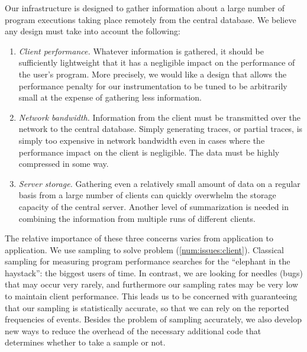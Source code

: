Our infrastructure is designed to gather information about a
large number of program executions taking place remotely from
the central database.  We believe any design must take into account
the following:
\begin{enumerate}
  
\item \label{num:issues:client} \emph{Client performance.}  Whatever
  information is gathered, it should be sufficiently lightweight that
  it has a negligible impact on the performance of the user's program.
  More precisely, we would like a design that allows the performance
  penalty for our instrumentation to be tuned to be arbitrarily small
  at the expense of gathering less information.
  
\item \label{num:issues:network} \emph{Network bandwidth.}
  Information from the client must be transmitted over the network to
  the central database.  Simply generating traces, or partial traces,
  is simply too expensive in network bandwidth even in cases where the
  performance impact on the client is negligible.  The data must be
  highly compressed in some way.
  
\item \label{num:issues:server} \emph{Server storage.}  Gathering even
  a relatively small amount of data on a regular basis from a large
  number of clients can quickly overwhelm the storage capacity of the
  central server.  Another level of summarization is needed in
  combining the information from multiple runs of different clients.

\end{enumerate}

The relative importance of these three concerns varies from
application to application.  We use sampling to solve problem
(\ref{num:issues:client}).  Classical sampling for measuring program
performance searches for the ``elephant in the haystack'': the biggest
users of time.  In contrast, we are looking for needles (bugs) that
may occur very rarely, and furthermore our sampling rates may be very
low to maintain client performance.  This leads us to be concerned
with guaranteeing that our sampling is statistically accurate, so that
we can rely on the reported frequencies of events.  Besides the
problem of sampling accurately, we also develop new ways to reduce the
overhead of the necessary additional code that determines whether to
take a sample or not.

